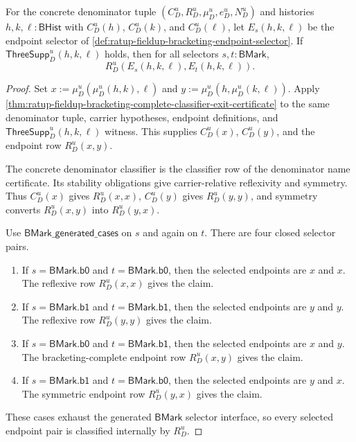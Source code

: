 \begin{theorem}
\label{thm:ratup-fieldup-bracketing-selector-denominator-classifier-coverage}
For the concrete denominator tuple $(C_D^u,R_D^u,\mu_D^u,e_D^u,N_D^u)$ and
histories $h,k,\ell:\mathsf{BHist}$ with $C_D^u(h)$, $C_D^u(k)$, and
$C_D^u(\ell)$, let $E_s(h,k,\ell)$ be the endpoint selector of
\autoref{def:ratup-fieldup-bracketing-endpoint-selector}. If
$\mathsf{ThreeSupp}_D^u(h,k,\ell)$ holds, then for all selectors
$s,t:\mathsf{BMark}$,
$$
R_D^u(E_s(h,k,\ell),E_t(h,k,\ell)).
$$
\end{theorem}
\begin{proof}
Set $x:=\mu_D^u(\mu_D^u(h,k),\ell)$ and
$y:=\mu_D^u(h,\mu_D^u(k,\ell))$. Apply
\autoref{thm:ratup-fieldup-bracketing-complete-classifier-exit-certificate}
to the same denominator tuple, carrier hypotheses, endpoint definitions, and
$\mathsf{ThreeSupp}_D^u(h,k,\ell)$ witness. This supplies $C_D^u(x)$,
$C_D^u(y)$, and the endpoint row $R_D^u(x,y)$.

The concrete denominator classifier is the classifier row of the denominator
name certificate. Its stability obligations give carrier-relative reflexivity
and symmetry. Thus $C_D^u(x)$ gives $R_D^u(x,x)$, $C_D^u(y)$ gives
$R_D^u(y,y)$, and symmetry converts $R_D^u(x,y)$ into $R_D^u(y,x)$.

Use $\mathsf{BMark\_generated\_cases}$ on $s$ and again on $t$. There are four
closed selector pairs.

\begin{enumerate}
  \item If $s=\mathsf{BMark.b0}$ and $t=\mathsf{BMark.b0}$, then the selected
  endpoints are $x$ and $x$. The reflexive row $R_D^u(x,x)$ gives the claim.

  \item If $s=\mathsf{BMark.b1}$ and $t=\mathsf{BMark.b1}$, then the selected
  endpoints are $y$ and $y$. The reflexive row $R_D^u(y,y)$ gives the claim.

  \item If $s=\mathsf{BMark.b0}$ and $t=\mathsf{BMark.b1}$, then the selected
  endpoints are $x$ and $y$. The bracketing-complete endpoint row $R_D^u(x,y)$
  gives the claim.

  \item If $s=\mathsf{BMark.b1}$ and $t=\mathsf{BMark.b0}$, then the selected
  endpoints are $y$ and $x$. The symmetric endpoint row $R_D^u(y,x)$ gives the
  claim.
\end{enumerate}

These cases exhaust the generated $\mathsf{BMark}$ selector interface, so every
selected endpoint pair is classified internally by $R_D^u$.
\end{proof}

